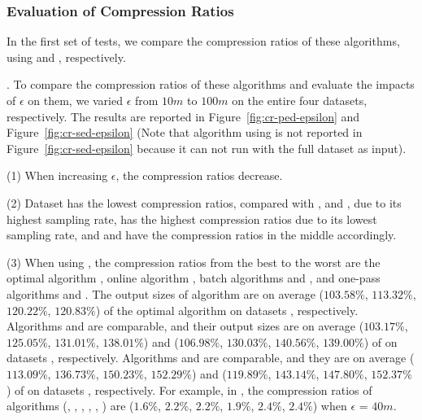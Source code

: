 \vspace{-1ex}
\subsubsection{Evaluation of Compression Ratios}

In the first set of tests, we compare the compression ratios of these algorithms, using \ped and \sed, respectively.

.
To compare the compression ratios of these algorithms and evaluate the impacts of $\epsilon$ on them, we varied $\epsilon$ from $10m$ to $100m$ on the entire four datasets, respectively.
The results are reported in Figure~\ref{fig:cr-ped-epsilon} and Figure~\ref{fig:cr-sed-epsilon} (Note that algorithm \opt using \sed is not reported in Figure~\ref{fig:cr-sed-epsilon} because it can not run with the full dataset as input).


\sstab (1) When increasing $\epsilon$, the compression ratios decrease. 

\sstab (2) Dataset \act has the lowest compression ratios, compared with \ucar, \geolife and \mopsi, due to its highest sampling rate, \ucar has the highest compression ratios due to its lowest sampling rate, and \geolife and \mopsi have the compression ratios in the middle accordingly.

\sstab (3) When using \ped, the compression ratios from the best
to the worst are the optimal algorithm \optp, online algorithm \bqsa, batch algorithms \tpa and
\dpa, and one-pass algorithms \siped and \operb. 
The output sizes of algorithm \bqsa are on average
($103.58\%$, $113.32\%$, $120.22\%$, $120.83\%$) of the optimal algorithm \optp
on datasets \dSets, respectively. 
Algorithms \tpa and \dpa are comparable, and their output sizes are on average
($103.17\%$, $125.05\%$, $131.01\%$, $138.01\%$) and ($106.98\%$, $130.03\%$, $140.56\%$, $139.00\%$) of \optp
on datasets \dSets, respectively.
Algorithms \siped and \operb are comparable, and they are on average
($113.09\%$, $136.73\%$, $150.23\%$, $152.29\%$)
and ($119.89\%$, $143.14\%$, $147.80\%$, $152.37\%$) of \optp on datasets \dSets, respectively.
%
For example, in \mopsi, the compression ratios of algorithms
(\optp, \tpa, \dpa, \bqsa, \siped, \operb ) are ($1.6\%$, $2.2\%$, $2.2\%$, $1.9\%$, $2.4\%$, $2.4\%$) when $\epsilon$ = $40m$.

